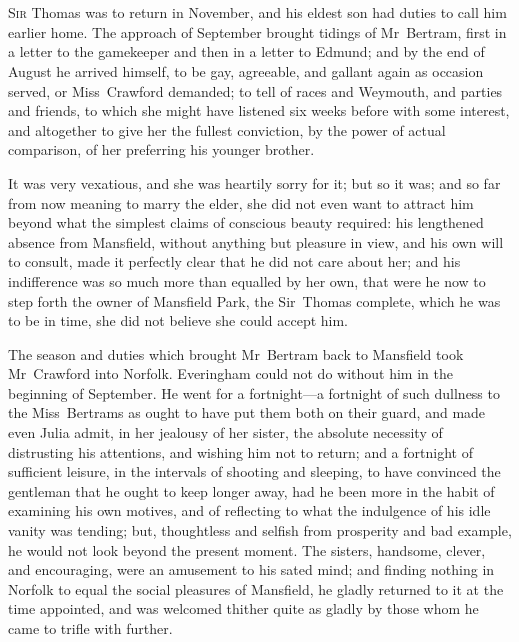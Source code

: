 \chapter[Chapter \thechapter]{} 

 \lettrine[lraise=0.3]{S}{ir} Thomas was to return in November, and his eldest son had duties to call him earlier home. The approach of September brought tidings of Mr~Bertram, first in a letter to the gamekeeper and then in a letter to Edmund; and by the end of August he arrived himself, to be gay, agreeable, and gallant again as occasion served, or Miss~Crawford demanded; to tell of races and Weymouth, and parties and friends, to which she might have listened six weeks before with some interest, and altogether to give her the fullest conviction, by the power of actual comparison, of her preferring his younger brother.

It was very vexatious, and she was heartily sorry for it; but so it was; and so far from now meaning to marry the elder, she did not even want to attract him beyond what the simplest claims of conscious beauty required: his lengthened absence from Mansfield, without anything but pleasure in view, and his own will to consult, made it perfectly clear that he did not care about her; and his indifference was so much more than equalled by her own, that were he now to step forth the owner of Mansfield Park, the Sir~Thomas complete, which he was to be in time, she did not believe she could accept him.

The season and duties which brought Mr~Bertram back to Mansfield took Mr~Crawford into Norfolk. Everingham could not do without him in the beginning of September. He went for a fortnight—a fortnight of such dullness to the Miss~Bertrams as ought to have put them both on their guard, and made even Julia admit, in her jealousy of her sister, the absolute necessity of distrusting his attentions, and wishing him not to return; and a fortnight of sufficient leisure, in the intervals of shooting and sleeping, to have convinced the gentleman that he ought to keep longer away, had he been more in the habit of examining his own motives, and of reflecting to what the indulgence of his idle vanity was tending; but, thoughtless and selfish from prosperity and bad example, he would not look beyond the present moment. The sisters, handsome, clever, and encouraging, were an amusement to his sated mind; and finding nothing in Norfolk to equal the social pleasures of Mansfield, he gladly returned to it at the time appointed, and was welcomed thither quite as gladly by those whom he came to trifle with further.


